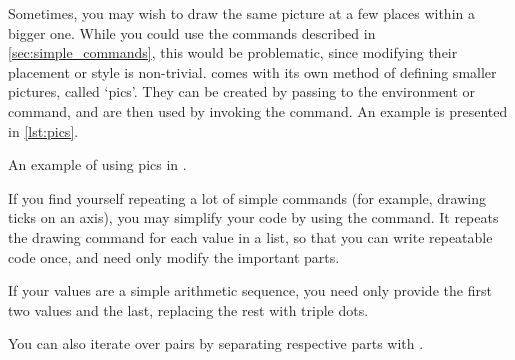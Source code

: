 Sometimes, you may wish to draw the same picture at a few places within a bigger
one. While you could use the commands described in
\autoref{sec:simple_commands}, this would be problematic, since modifying their
placement or style is non-trivial. \TikZ{} comes with its own method of
defining smaller pictures, called `pics'. They can be created by passing
 to the \TikZ{} environment or command,
and are then used by invoking the  command. An example is
presented in \autoref{lst:pics}.
\begin{listing}
  \begin{example}[vertical_mode, examplewidth=0.9\linewidth]
\end{example}
  \caption{An example of using pics in \TikZ{}.}\label{lst:pics}
\end{listing}

If you find yourself repeating a lot of simple commands (for example, drawing
ticks on an axis), you may simplify your code by using the  command. It
repeats the drawing command for each value in a list, so that you can
write repeatable code once, and need only modify the important parts.
\begin{example}[vertical_mode, examplewidth=0.8\linewidth]
\end{example}
If your values are a simple arithmetic sequence, you need only provide the first
two values and the last, replacing the rest with triple dots.
\begin{example}[vertical_mode, examplewidth=0.8\linewidth]
\end{example}
You can also iterate over pairs by separating respective parts with \ltx{/}.
\begin{example}
\end{example}

